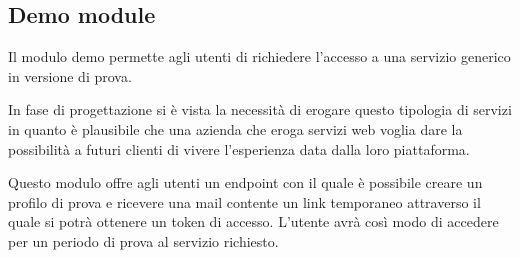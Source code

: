 \subsection{Demo module}
Il modulo demo permette agli utenti di richiedere l'accesso a una servizio generico in
versione di prova. 

In fase di progettazione si è vista la necessità di erogare questo tipologia
di servizi in quanto è plausibile che una azienda che eroga servizi web voglia dare la possibilità
a futuri clienti di vivere l'esperienza data dalla loro piattaforma.

Questo modulo offre agli utenti un endpoint con il quale è possibile creare un profilo di prova
e ricevere una mail contente un link temporaneo attraverso il quale si potrà ottenere un token di accesso.
L'utente avrà così modo di accedere per un periodo di prova al servizio richiesto.